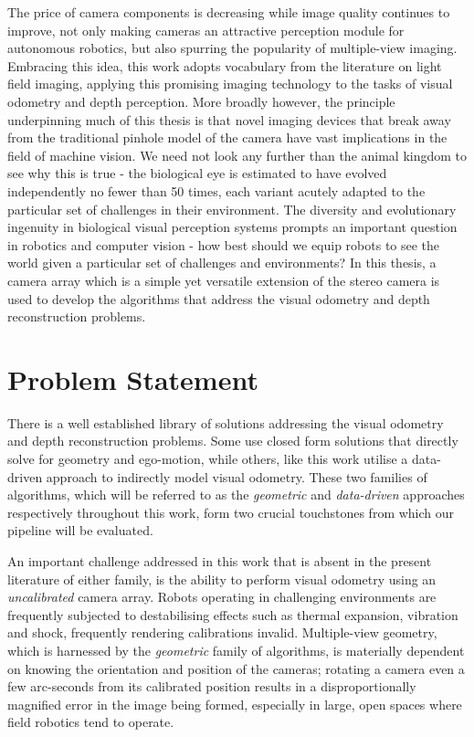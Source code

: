 The price of camera components is decreasing while image quality continues to improve, not only making cameras an attractive perception module for autonomous robotics, but also spurring the popularity of multiple-view imaging. Embracing this idea, this work adopts vocabulary from the literature on light field imaging, applying this promising imaging technology to the tasks of visual odometry and depth perception. More broadly however, the principle underpinning much of this thesis is that novel imaging devices that break away from the traditional pinhole model of the camera have vast implications in the field of machine vision. We need not look any further than the animal kingdom to see why this is true - the biological eye is estimated to have evolved independently no fewer than 50 times, each variant acutely adapted to the particular set of challenges in their environment. The diversity and evolutionary ingenuity in biological visual perception systems prompts an important question in robotics and computer vision - how best should we equip robots to see the world given a particular set of challenges and environments? In this thesis, a camera array which is a simple yet versatile extension of the stereo camera is used to develop the algorithms that address the visual odometry and depth reconstruction problems. 



\section{Problem Statement}

There is a well established library of solutions addressing the visual odometry and depth reconstruction problems. Some use closed form solutions that directly solve for geometry and ego-motion, while others, like this work utilise a data-driven approach to indirectly model visual odometry. These two families of algorithms, which will be referred to as the \textit{geometric} and \textit{data-driven} approaches respectively throughout this work, form two crucial touchstones from which our pipeline will be evaluated. 

An important challenge addressed in this work that is absent in the present literature of either family, is the ability to perform visual odometry using an \textit{uncalibrated} camera array. Robots operating in challenging environments are frequently subjected to destabilising effects such as thermal expansion, vibration and shock, frequently rendering calibrations invalid. Multiple-view geometry, which is harnessed by the \textit{geometric} family of algorithms, is materially dependent on knowing the orientation and position of the cameras; rotating a camera even a few arc-seconds from its calibrated position results in a disproportionally magnified error in the image being formed, especially in large, open spaces where field robotics tend to operate. 

